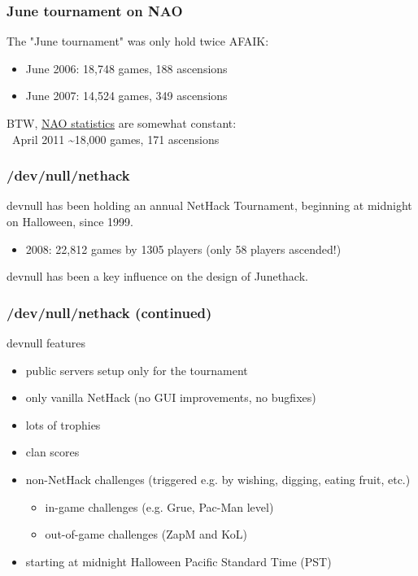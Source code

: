 \documentclass[handout]{beamer}
\begin{document}
\begin{frame}
\frametitle{June tournament on NAO}
  The "June tournament" was only hold twice AFAIK:\pause
  \begin{itemize}[<+->]
    \item June 2006: 18,748 games, 188 ascensions
    \item June 2007: 14,524 games, 349 ascensions
  \end{itemize}\pause
  \vfill
  BTW, \href{http://alt.org/nethack/perday.html}{NAO statistics} are somewhat constant:\\
  ~April 2011 \textasciitilde 18,000 games, 171 ascensions
  \vfill
\end{frame}

\begin{frame}
\frametitle{/dev/null/nethack}
  devnull has been holding an annual NetHack Tournament, beginning at midnight on Halloween, since 1999.\pause
  \begin{itemize}[<+->]
    \item 2008: 22,812 games by 1305 players (only 58 players ascended!)
  \end{itemize}\pause
  \vfill
  devnull has been a key influence on the design of Junethack.
  \vfill
\end{frame}

\begin{frame}
\frametitle{/dev/null/nethack (continued)}
  devnull features\pause
  \begin{itemize}[<+->]
    \item public servers setup only for the tournament
    \item only vanilla NetHack (no GUI improvements, no bugfixes)
    \item lots of trophies
    \item clan scores
    \item non-NetHack challenges (triggered e.g. by wishing, digging, eating fruit, etc.)
    \begin{itemize}[<+->]
      \item in-game challenges (e.g. Grue, Pac-Man level)
      \item out-of-game challenges (ZapM and KoL)
    \end{itemize}
    \item starting at midnight Halloween Pacific Standard Time (PST)
  \end{itemize}
\end{frame}
\end{document}
